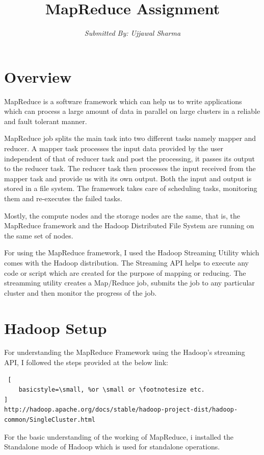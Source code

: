 \documentclass[a4paper, 10pt]{article}
\begin{document}
\title{\textbf{MapReduce Assignment}}
\author{\textit{Submitted By: Ujjawal Sharma}}
\date{}
\maketitle

\section{Overview}
\noindent
MapReduce is a software framework which can help us to write applications which can process a large amount of data in parallel on large clusters in a reliable and fault tolerant manner.

MapReduce job splits the main task into two different tasks namely mapper and reducer. A mapper task processes the input data provided by the user independent of that of reducer task and post the processing, it passes its output to the reducer task. The reducer task then processes the input received from the mapper task and provide us with its own output. Both the input and output is stored in a file system. The framework takes care of scheduling tasks, monitoring them and re-executes the failed tasks.

Mostly, the compute nodes and the storage nodes are the same, that is, the MapReduce framework and the Hadoop Distributed File System are running on the same set of nodes.

For using the MapReduce framework, I used the Hadoop Streaming Utility which comes with the Hadoop distribution. The Streaming API helps to execute any code or script which are created for the purpose of mapping or reducing. The streamming utility creates a Map/Reduce job, submits the job to any particular cluster and then monitor the progress of the job. 

\section{Hadoop Setup}

For understanding the MapReduce Framework using the Hadoop's streaming API, I followed the steps provided at the below link:

\begin{lstlisting} [
    basicstyle=\small, %or \small or \footnotesize etc.
]
http://hadoop.apache.org/docs/stable/hadoop-project-dist/hadoop-common/SingleCluster.html
\end{lstlisting}

For the basic understanding of the working of MapReduce, i installed the Standalone mode of Hadoop which is used for standalone operations.
\end{document}

